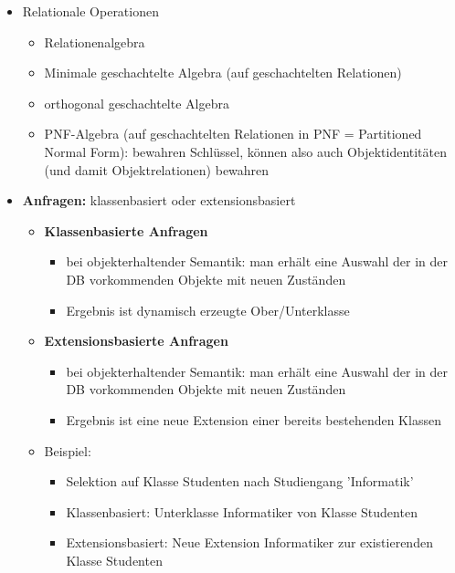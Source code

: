 \begin{itemize}
	\item Relationale Operationen
	\begin{itemize}
		\item Relationenalgebra
		\item Minimale geschachtelte Algebra (auf geschachtelten Relationen)
		\item orthogonal geschachtelte Algebra
		\item PNF-Algebra (auf geschachtelten Relationen in PNF = Partitioned Normal Form): bewahren Schlüssel, können also auch Objektidentitäten (und damit Objektrelationen) bewahren
	\end{itemize}
	
	\item \textbf{Anfragen:} klassenbasiert oder extensionsbasiert
	\begin{itemize}
		\item \textbf{Klassenbasierte Anfragen}
		\begin{itemize}
			\item bei objekterhaltender Semantik: man erhält eine Auswahl der in der DB vorkommenden Objekte mit neuen Zuständen
			\item Ergebnis ist dynamisch erzeugte Ober/Unterklasse
		\end{itemize}
		
		\item \textbf{Extensionsbasierte Anfragen}
		\begin{itemize}
			\item bei objekterhaltender Semantik: man erhält eine Auswahl der in der DB vorkommenden Objekte mit neuen Zuständen
			\item Ergebnis ist eine neue Extension einer bereits bestehenden Klassen
		\end{itemize}
		
		\item Beispiel:
		\begin{itemize}
			\item Selektion auf Klasse Studenten nach Studiengang 'Informatik'
			\item Klassenbasiert: Unterklasse Informatiker von Klasse Studenten
			\item Extensionsbasiert: Neue Extension Informatiker zur existierenden Klasse Studenten
		\end{itemize}
	\end{itemize}
\end{itemize}


